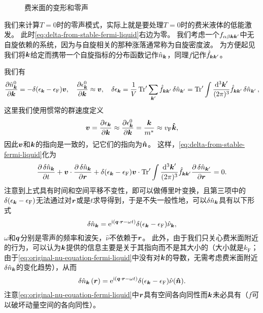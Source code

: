 \begin{figure}
    \centering
    \subfigure[变形的费米面，费米液体在$T=0$时的低能激发普遍具有这个形式]{
        
    }
    \caption{费米面的变形和零声}
\end{figure}


我们来计算$T=0$时的零声模式，实际上就是要处理$T=0$时的费米液体的低能激发。
此时\eqref{eq:delta-from-stable-fermi-liquid}右边为零。
我们考虑一个$f_{\alpha \beta \vb*{k} \vb*{k}'}$中无自旋依赖的系统，因为与自旋相关的那种涨落通常称为自旋密度波。
为方便起见我们将$\vb*{k}$给定而携带一个自旋指标的分布函数记作$\hat{n}_{\vb*{k}}$，同理$f$记作$\hat{f}_{\vb*{k} \vb*{k}'}$。

我们有
\[
    \pdv{\hat{n}^0_{\vb*{k}}}{\vb*{k}} = - \delta(\epsilon_{\vb*{k}} - \epsilon_\text{F}) \vb*{v}, \quad  \pdv{\epsilon_{\vb*{k}}^0}{\vb*{k}} \approx \vb*{v}, \quad \var{\epsilon_{\vb*{k}}} = \frac{1}{V} \Trace' \sum_{\vb*{k}'} \hat{f}_{\vb*{k} \vb*{k}'} \var{\hat{n}_{\vb*{k}'}} = \Trace' \int \frac{\dd[3]{\vb*{k}'}}{(2\pi)^3} \hat{f}_{\vb*{k} \vb*{k}'} \var{\hat{n}_{\vb*{k}'}},
\]
这里我们使用惯常的群速度定义
\begin{equation}
    \vb*{v} = \pdv{\epsilon_{\vb*{k}}}{\vb*{k}} \approx \pdv{\epsilon^0_{\vb*{k}}}{\vb*{k}} = \frac{\vb*{k}}{m^*} \approx v_\text{F} \vu*{k},
\end{equation}
因此$\vb*{v}$和$\vb*{k}$的指向是一致的，记它们的指向为$\vu*{n}$。
这样，\eqref{eq:delta-from-stable-fermi-liquid}化为
\begin{equation}
    \pdv{\var{\hat{n}_{\vb*{k}}}}{t} + \vb*{v} \cdot \pdv{\var{\hat{n}_{\vb*{k}}}}{\vb*{r}} + \delta(\epsilon_{\vb*{k}} - \epsilon_\text{F}) \vb*{v} \cdot \Trace' \int \frac{\dd[3]{\vb*{k}'}}{(2\pi)^3} \hat{f}_{\vb*{k} \vb*{k}'} \pdv{\var{\hat{n}_{\vb*{k}'}}}{\vb*{r}} = 0.
    \label{eq:original-nu-equation-fermi-liquid}
\end{equation}
注意到上式具有时间和空间平移不变性，即可以做傅里叶变换，且第三项中的$\delta(\epsilon_{\vb*{k}} - \epsilon_\text{F})$无法通过对$\vb*{r}$或是$t$求导得到，于是不失一般性地，可以$\var{\hat{n}_{\vb*{k}}}$具有以下形式
\[
    \var{\hat{n}_{\vb*{k}}} = \mathrm{e}^{\mathrm{i} (\vb*{q} \cdot \vb*{r} - \omega t)} \delta(\epsilon_{\vb*{k}} - \epsilon_\text{F}) \hat{\nu}_{\vb*{k}},
\]
$\omega$和$\vb*{q}$分别是零声的频率和波矢，$\hat{\nu}$不依赖于$\vb*{r}$。
此外，由于我们只关心费米面附近的行为，可以认为$\vb*{k}$提供的信息主要是关于其指向而不是其大小的（大小就是$k_\text{F}$；由于\eqref{eq:original-nu-equation-fermi-liquid}中没有对$\vb*{k}$的导数，无需考虑费米面附近$\var{\hat{n}_{\vb*{k}}}$的变化趋势），从而
\begin{equation}
    \var{\hat{n}_{\vb*{k}}}(\vb*{r}) = \mathrm{e}^{\mathrm{i} (\vb*{q} \cdot \vb*{r} - \omega t)} \delta(\epsilon_{\vb*{k}} - \epsilon_\text{F}) \hat{\nu}(\vu*{n}).
    \label{eq:zero-sound-distribution-form}
\end{equation}
注意\eqref{eq:original-nu-equation-fermi-liquid}中$\vb*{r}$具有空间各向同性而$\vb*{k}$未必具有（$f$可以破坏动量空间的各向同性）。

